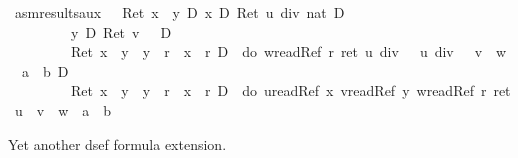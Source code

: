 \begin{isabellebody}
\isamarkupfalse%
\isamarkupfalse%
\isamarkupfalse%
\isamarkupfalse%
\isamarkupfalse%
\isamarkupfalse%
\isamarkupfalse%
\isamarkupfalse%
\isamarkupfalse%
\isamarkupfalse%
\isamarkupfalse%
\isamarkupfalse%
\isamarkupfalse%
\isamarkupfalse%
\isamarkupfalse%
\isamarkupfalse%
\isanewline
\isanewline
\isamarkupfalse%
\ asm{\isacharunderscore}results{\isacharunderscore}aux{\isacharcolon}\ {\isachardoublequote}\ {\isasymturnstile}\ {\isacharparenleft}Ret\ {\isacharparenleft}x\ {\isasymnoteq}\ y{\isacharparenright}\ {\isasymlongrightarrow}\isactrlsub D\ {\isacharasterisk}x\ {\isacharequal}\isactrlsub D\ Ret\ {\isacharparenleft}u\ div\ {\isacharparenleft}{}{\isacharcolon}{\isacharcolon}nat{\isacharparenright}{\isacharparenright}{\isacharparenright}\ {\isasymand}\isactrlsub D\isanewline
\ \ \ \ \ \ \ \ \ {\isacharasterisk}y\ {\isacharequal}\isactrlsub D\ Ret\ {\isacharparenleft}v\ {\isacharasterisk}\ {}{\isacharparenright}\ {\isasymand}\isactrlsub D\isanewline
\ \ \ \ \ \ \ \ \ Ret\ {\isacharparenleft}x\ {\isasymnoteq}\ y\ {\isasymand}\ y\ {\isasymnoteq}\ r\ {\isasymand}\ x\ {\isasymnoteq}\ r{\isacharparenright}\ {\isasymand}\isactrlsub D\ {\isasymUp}\ {\isacharparenleft}do\ {\isacharbraceleft}w{\isasymleftarrow}readRef\ r{\isacharsemicolon}\ ret\ {\isacharparenleft}{\isacharparenleft}u\ div\ {}\ {\isacharplus}\ u\ div\ {}{\isacharparenright}\ {\isacharasterisk}\ v\ {\isacharplus}\ w\ {\isacharequal}\ a\ {\isacharasterisk}\ b{\isacharparenright}{\isacharbraceright}{\isacharparenright}\ {\isasymlongrightarrow}\isactrlsub D\isanewline
\ \ \ \ \ \ \ \ \ Ret\ {\isacharparenleft}x\ {\isasymnoteq}\ y\ {\isasymand}\ y\ {\isasymnoteq}\ r\ {\isasymand}\ x\ {\isasymnoteq}\ r{\isacharparenright}\ {\isasymand}\isactrlsub D\ {\isasymUp}\ {\isacharparenleft}do\ {\isacharbraceleft}u{\isasymleftarrow}readRef\ x{\isacharsemicolon}\ v{\isasymleftarrow}readRef\ y{\isacharsemicolon}\ w{\isasymleftarrow}readRef\ r{\isacharsemicolon}\ ret\ {\isacharparenleft}u\ {\isacharasterisk}\ v\ {\isacharplus}\ w\ {\isacharequal}\ a\ {\isacharasterisk}\ b{\isacharparenright}{\isacharbraceright}{\isacharparenright}{\isachardoublequote}\isamarkupfalse%
\isamarkupfalse%
\isamarkupfalse%
\isamarkupfalse%
\isamarkupfalse%
\isamarkupfalse%
\isamarkupfalse%
\isamarkupfalse%
\isamarkupfalse%
\isamarkupfalse%
\isamarkupfalse%
\isamarkupfalse%
\isamarkupfalse%
\isamarkupfalse%
%
\begin{isamarkuptext}%
Yet another dsef formula extension.%
\end{isamarkuptext}%
\isamarkuptrue%

\end{isabellebody}
